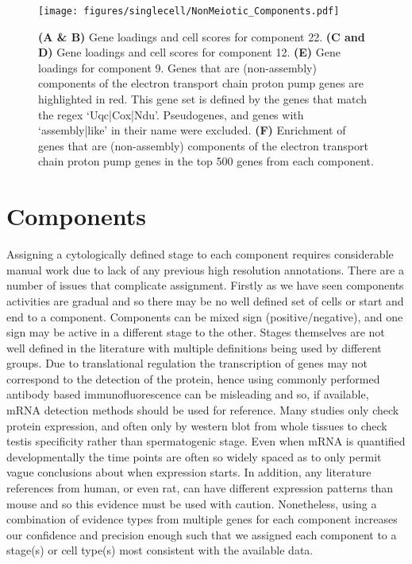 \begin{figure}[H]
	\centering
	\texttt{[image: figures/singlecell/NonMeiotic\_Components.pdf]}
	\caption[Non Meiotic Components]{
		\textbf{(A \& B)} Gene loadings and cell scores for component 22.
		\textbf{(C and D)} Gene loadings and cell scores for component 12.
		\textbf{(E)} Gene loadings for component 9. Genes that are (non-assembly) components of the electron transport chain proton pump genes are highlighted in red. This gene set is defined by the genes that match the regex ‘Uqc|Cox|Ndu’. Pseudogenes, and genes with ‘assembly|like’ in their name were excluded.
		\textbf{(F)} Enrichment of genes that are (non-assembly) components of the electron transport chain proton pump genes in the top 500 genes from each component.
	}
	\label{fig:NonMeiotic}
\end{figure}


\section{Components}

Assigning a cytologically defined stage to each component requires considerable manual work due to lack of any previous high resolution annotations. There are a number of issues that complicate assignment. Firstly as we have seen components activities are gradual and so there may be no well defined set of cells or start and end to a component. Components can be mixed sign (positive/negative), and one sign may be active in a different stage to the other. Stages themselves are not well defined in the literature with multiple definitions being used by different groups. Due to translational regulation the transcription of genes may not correspond to the detection of the protein, hence using commonly performed antibody based immunofluorescence can be misleading and so, if available, mRNA detection methods should be used for reference. Many studies only check protein expression, and often only by western blot from whole tissues to check testis specificity rather than spermatogenic stage. Even when mRNA is quantified developmentally the time points are often so widely spaced as to only permit vague conclusions about when expression starts. In addition, any literature references from human, or even rat, can have different expression patterns than mouse and so this evidence must be used with caution. Nonetheless, using a combination of evidence types from multiple genes for each component increases our confidence and precision enough such that we assigned each component to a stage(s) or cell type(s) most consistent with the available data.


